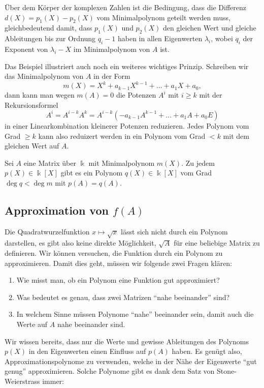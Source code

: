 Über dem Körper der komplexen Zahlen ist die Bedingung, dass die Differenz
$d(X)=p_1(X)-p_2(X)$ vom Minimalpolynom geteilt werden muss, gleichbedeutend
damit, dass $p_1(X)$ und $p_2(X)$ den gleichen Wert und gleiche Ableitungen
bis zur Ordnung $q_i-1$ haben in allen Eigenwerten $\lambda_i$, wobei 
$q_i$ der Exponent von $\lambda_i-X$ im Minimalpolynom von $A$ ist.

Das Beispiel illustriert auch noch ein weiteres wichtiges Prinzip.
Schreiben wir das Minimalpolynom von $A$ in der Form
\[
m(X)
=
X^k + a_{k-1}X^{k-1} + \dots + a_1X + a_0,
\]
dann kann man wegen $m(A)=0$ die Potenzen $A^i$ mit $i\ge k$ mit der
Rekursionsformel
\[
A^i
=
A^{i-k}A^k
=
A^{i-k}(-a_{k-1}A^{k-1}+ \dots + a_1 A + a_0E)
\]
in einer Linearkombination kleinerer Potenzen reduzieren.
Jedes Polynom vom Grad $\ge k$ kann also reduizert werden in
ein Polynom vom Grad $<k$ mit dem gleichen Wert auf $A$.

\begin{satz}
\label{buch:eigenwerte:satz:reduktion}
Sei $A$ eine Matrix über $\Bbbk$ mit Minimalpolynom $m(X)$.
Zu jedem $p(X)\in\Bbbk[X]$ gibt es ein Polynom $q(X)\in\Bbbk[X]$
vom Grad $\deg q<\deg m$ mit $p(A)=q(A)$.
\end{satz}

%
%
\subsection{Approximation von $f(A)$
\label{buch:subsection:approximation}}
Die Quadratwurzelfunktion $x\mapsto\sqrt{x}$ lässt sich nicht durch ein
Polynom darstellen, es gibt also keine direkte Möglichkeit, $\sqrt{A}$
für eine beliebige Matrix zu definieren.
Wir können versuchen, die Funktion durch ein Polynom zu approximieren.
Damit dies geht, müssen wir folgende zwei Fragen klären:
\begin{enumerate}
\item
Wie misst man, ob ein Polynom eine Funktion gut approximiert?
\item
Was bedeutet es genau, dass zwei Matrizen ``nahe beeinander'' sind?
\item
In welchem Sinne müssen Polynome ``nahe'' beeinander sein, damit
auch die Werte auf $A$ nahe beeinander sind.
\end{enumerate}

Wir wissen bereits, dass nur die Werte und gewisse Ableitungen des
Polynoms $p(X)$ in den Eigenwerten einen Einfluss auf $p(A)$ haben.
Es genügt also, Approximationspolynome zu verwenden, welche in der Nähe
der Eigenwerte ``gut genug'' approximieren.
Solche Polynome gibt es dank dem Satz von Stone-Weierstrass immer:

